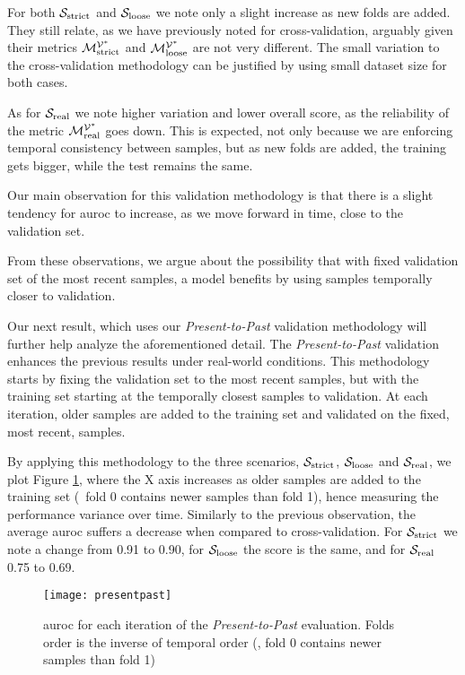 For both $\mathcal{S}_{\mathrm{strict}}$ and $\mathcal{S}_{\mathrm{loose}}$ we note only a slight increase as new folds are added.
They still relate, as we have previously noted for cross-validation, arguably given their metrics $\mathcal{M}_{\mathrm{strict}}^{\mathcal{V}^*}$ and $\mathcal{M}_{\mathrm{loose}}^{\mathcal{V}^*}$ are not very different.
The small variation to the cross-validation methodology can be justified by using small dataset size for both cases.

As for $\mathcal{S}_{\mathrm{real}}$ we note higher variation and lower overall score, as the reliability of the metric $\mathcal{M}_{\mathrm{real}}^{\mathcal{V}^*}$ goes down.
This is expected, not only because we are enforcing temporal consistency between samples, but as new folds are added, the training gets bigger, while the test remains the same.

Our main observation for this validation methodology is that there is a slight tendency for \gls{auroc} to increase, as we move forward in time, close to the validation set.

From these observations, we argue about the possibility that with fixed validation set of the most recent samples, a model benefits by using samples temporally closer to validation.

\medskip

Our next result, which uses our \textit{Present-to-Past} validation methodology will further help analyze the aforementioned detail.
The \textit{Present-to-Past} validation enhances the previous results under real-world conditions. 
This methodology starts by fixing the validation set to the most recent samples, but with the training set starting at the temporally closest samples to validation.
At each iteration, older samples are added to the training set and validated on the fixed, most recent, samples.

By applying this methodology to the three scenarios, $\mathcal{S}_{\mathrm{strict}}$, $\mathcal{S}_{\mathrm{loose}}$ and $\mathcal{S}_{\mathrm{real}}$, we plot Figure \ref{fig:presentpast}, where the X axis increases as older samples are added to the training set (\eg\ fold 0 contains newer samples than fold 1), hence measuring the performance variance over time. Similarly to the previous observation, the average \gls{auroc} suffers a decrease when compared to cross-validation.
For $\mathcal{S}_{\mathrm{strict}}$ we note a change from 0.91 to 0.90, for $\mathcal{S}_{\mathrm{loose}}$ the score is the same, and for $\mathcal{S}_{\mathrm{real}}$ 0.75 to 0.69.

\begin{figure}[!h]
	\centering
	\texttt{[image: presentpast]}
	\caption{\gls{auroc} for each iteration of the \textit{Present-to-Past} evaluation. Folds order is the inverse of temporal order (\ie, fold 0 contains newer samples than fold 1)}
	\label{fig:presentpast}
\end{figure}

